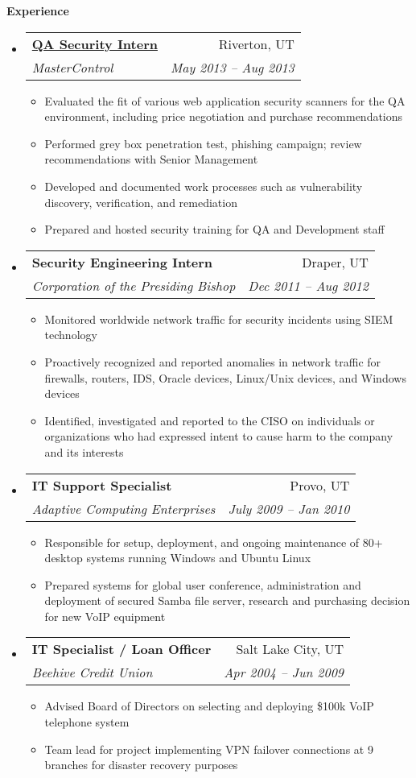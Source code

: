 \documentclass[letterpaper,11pt]{article}
\makeatletter
\newcommand{\resitem}[1]{\item #1 \vspace{-2pt}}
\newcommand{\resheading}[1]{{\large \colorbox{mygrey}{\begin{minipage}{\textwidth}{\textbf{#1 \vphantom{p\^{E}}}}\end{minipage}}}}
\newcommand{\ressubheading}[4]{
\begin{tabular*}{6.5in}{l@{\extracolsep{\fill}}r}
		\textbf{#1} & #2 \\
		\textit{#3} & \textit{#4} \\
\end{tabular*}\vspace{-6pt}}
\makeatother
\begin{document}
\resheading{Experience}
	\begin{itemize}
		\item 
			\ressubheading{\href{}{QA Security Intern}}{Riverton, UT}{MasterControl}{May 2013 -- Aug 2013}
				{ \footnotesize
				\begin{itemize}
					\resitem{Evaluated the fit of various web application security scanners for the QA environment, including price negotiation and purchase recommendations}
					\resitem{Performed grey box penetration test, phishing campaign; review recommendations with Senior Management}
					\resitem{Developed and documented work processes such as vulnerability discovery, verification, and remediation}
					\resitem{Prepared and hosted security training for QA and Development staff}
				\end{itemize}
				}
		\item			
			\ressubheading{Security Engineering Intern}{Draper, UT}{Corporation of the Presiding Bishop}{Dec 2011 -- Aug 2012}
				{ \footnotesize				
				\begin{itemize}
					\resitem{Monitored worldwide network traffic for security incidents using SIEM technology}
					\resitem{Proactively recognized and reported anomalies in network traffic for firewalls, routers, IDS, Oracle devices, Linux/Unix devices, and Windows devices}
					\resitem{Identified, investigated and reported to the CISO on individuals or organizations who had expressed intent to cause harm to the company and its interests}
				\end{itemize}
				}
		\item 
			\ressubheading{IT Support Specialist}{Provo, UT}{Adaptive Computing Enterprises}{July 2009 -- Jan 2010}
				{ \footnotesize
				\begin{itemize}
					\resitem{Responsible for setup, deployment, and ongoing maintenance of 80+ desktop systems running Windows and Ubuntu Linux}
					\resitem{Prepared systems for global user conference, administration and deployment of secured Samba file server, research and purchasing decision for new VoIP equipment}
				\end{itemize}
				}
		\item
			\ressubheading{IT Specialist / Loan Officer}{Salt Lake City, UT}{Beehive Credit Union}{Apr 2004 -- Jun 2009}
				{ \footnotesize
				\begin{itemize}
					\resitem{Advised Board of Directors on selecting and deploying \$100k VoIP telephone system}
					\resitem{Team lead for project implementing VPN failover connections at 9 branches for disaster recovery purposes}

\end{itemize}}
\end{itemize}
\end{document}
